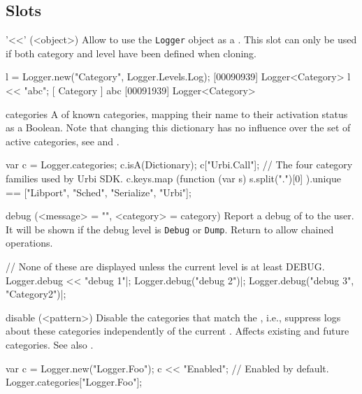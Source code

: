 \subsection{Slots}

\begin{urbiscriptapi}

\item['<<'](<object>)%
  Allow to use the \lstinline|Logger| object as a . This
  slot can only be used if both category and level have been defined when
  cloning.

\begin{urbiscript}
l = Logger.new("Category", Logger.Levels.Log);
[00090939] Logger<Category>
l << "abc";
[       Category        ] abc
[00091939] Logger<Category>
\end{urbiscript}

\item[categories]%
  A  of known categories, mapping their name to their
  activation status as a Boolean.  Note that changing this dictionary has no
  influence over the set of active categories, see  and
  .
\begin{urbiassert}[firstnumber=1]
var c = Logger.categories;
c.isA(Dictionary);
c["Urbi.Call"];
// The four category families used by Urbi SDK.
c.keys.map (function (var s) { s.split(".")[0] }).unique
  == ["Libport", "Sched", "Serialize", "Urbi"];
\end{urbiassert}

\item[debug](<message> = "", <category> = category)%
  Report a debug  of  to the user. It will be
  shown if the debug level is \lstinline|Debug| or \lstinline|Dump|. Return
  \this to allow chained operations.
\begin{urbiscript}
// None of these are displayed unless the current level is at least DEBUG.
Logger.debug << "debug 1"|;
Logger.debug("debug 2")|;
Logger.debug("debug 3", "Category2")|;
\end{urbiscript}

\item[disable](<pattern>)%
  Disable the categories that match the , i.e., suppress logs
  about these categories independently of the current .
  Affects existing and future categories.  See also .
\begin{urbiassert}
var c = Logger.new("Logger.Foo");
c << "Enabled";
// Enabled by default.
Logger.categories["Logger.Foo"];


\end{urbiassert}
\end{urbiscriptapi}
